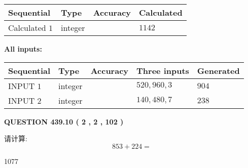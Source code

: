 \documentclass{ctexart}
\begin{document}
   
   
   
\noindent{}
   
   
  
  
\noindent\begin{tabular}{|l|l|l|l|}
\hline
 Sequential & Type & Accuracy & Calculated \\ 
\hline
 
 
  Calculated $  1 $ & integer &  & 
  $ 1142 $ 
 \\  \hline  
 \end{tabular}
   
   
   
   
\noindent\vspace{0.1in}\hspace{-0.08in} {\textbf{\Large{All inputs: }}}
   
   
  
  
\noindent\begin{tabular}{|l|l|l|l|l|}
\hline
 Sequential & Type & Accuracy & Three inputs & Generated \\ 
\hline
 
 
  INPUT $  1 $ & integer &  & $
 520
 , 
 960
 , 
 3
 $ & $ 904 $ 
 \\  \hline  
 
 
  INPUT $  2 $ & integer &  & $
 140
 , 
 480
 , 
 7
 $ & $ 238 $ 
 \\  \hline  
 \end{tabular}
   
   
  
\vspace{0.2in}
  
{\textbf{\Large{QUESTION
439.10 
 ( 2 , 2 , 102 )
}}}
  
  
 
请计算:
\begin{equation}
853 +  %
224 = \nonumber
\end{equation}
 
 
 
\noindent{}
 
 

1077
 
 
\noindent{}
 
 

 
 
 
\noindent{}
 
\end{document}
